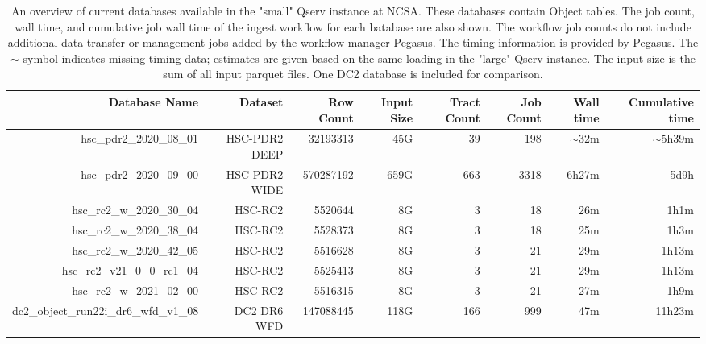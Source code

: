 \begin{table}
\tiny
\centering
\begin{tabular} {|r|r|r|r|r|r|r|r|}
\hline
{Database Name}&{Dataset}&{Row Count}&{Input Size}&{Tract Count}&{Job Count}&{Wall time}&{Cumulative time}
\\ \hline
{hsc\_pdr2\_2020\_08\_01} & HSC-PDR2 DEEP & 32193313  & 45G & 39  & 198 & $\sim$32m & $\sim$5h39m \\
{hsc\_pdr2\_2020\_09\_00} & HSC-PDR2 WIDE & 570287192 & 659G & 663 & 3318 & 6h27m & 5d9h \\

{hsc\_rc2\_w\_2020\_30\_04} & HSC-RC2 & 5520644 & 8G & 3 & 18 & 26m & 1h1m  \\
{hsc\_rc2\_w\_2020\_38\_04} & HSC-RC2 & 5528373 & 8G & 3 & 18 & 25m & 1h3m \\
{hsc\_rc2\_w\_2020\_42\_05} & HSC-RC2 & 5516628 & 8G & 3 & 21 & 29m & 1h13m \\

{hsc\_rc2\_v21\_0\_0\_rc1\_04 } & HSC-RC2 & 5525413 & 8G & 3 & 21 & 29m & 1h13m \\
{hsc\_rc2\_w\_2021\_02\_00} & HSC-RC2 & 5516315 & 8G & 3 & 21 & 27m & 1h9m \\

{dc2\_object\_run22i\_dr6\_wfd\_v1\_08} & DC2 DR6 WFD & 147088445 & 118G & 166 & 999 & 47m & 11h23m \\
\hline
\end{tabular}
\caption{
An overview of current databases available in the "small" Qserv instance at NCSA.
These databases contain Object tables.
The job count, wall time, and cumulative job wall time of the ingest workflow for each batabase are also shown.
The workflow job counts do not include additional data transfer or management jobs added by the workflow manager Pegasus.
The timing information is provided by Pegasus.
The $\sim$ symbol indicates missing timing data; estimates are given based on the same loading in the "large" Qserv instance.
The input size is the sum of all input parquet files.
One DC2 database is included for comparison.
}
\label{tab:examples}
\end{table}
